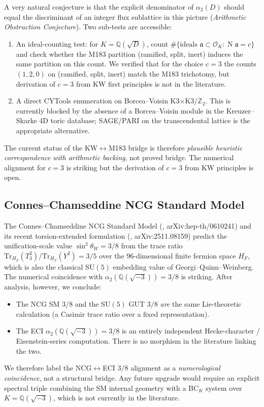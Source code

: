 \documentclass[12pt]{amsart}
\theoremstyle{definition}
\DeclareMathOperator{\Nm}{N}
\newcommand{\Q}{\mathbb{Q}}
\newcommand{\Z}{\mathbb{Z}}
\newcommand{\OK}{\mathcal{O}_K}
\begin{document}
A very natural conjecture is that the explicit denominator of
$\alpha_2(D)$ should equal the discriminant of an integer flux
sublattice in this picture (\emph{Arithmetic Obstruction
Conjecture}). Two sub-tests are accessible:
\begin{enumerate}[leftmargin=2em]
  \item An ideal-counting test: for $K = \Q(\sqrt{D})$, count
        $\#\{\text{ideals } \mathfrak{a} \subset \OK : \Nm \mathfrak{a} = c\}$
        and check whether the M183 partition (ramified, split, inert)
        induces the same partition on this count. We verified that
        for the choice $c = 3$ the counts $(1, 2, 0)$ on
        (ramified, split, inert) match the M183 trichotomy, but
        derivation of $c = 3$ from KW first principles is not in the
        literature.
  \item A direct CYTools enumeration on Borcea--Voisin K3$\times$K3$/\Z_2$.
        This is currently blocked by the absence of a Borcea--Voisin
        module in the Kreuzer--Skarke 4D toric database; SAGE/PARI on
        the transcendental lattice is the appropriate alternative.
\end{enumerate}
The current status of the KW$\leftrightarrow$M183 bridge is therefore
\emph{plausible heuristic correspondence with arithmetic backing}, not
proved bridge. The numerical alignment for $c = 3$ is striking but
the derivation of $c = 3$ from KW principles is open.

\subsection{Connes--Chamseddine NCG Standard Model}

The Connes--Chamseddine NCG Standard Model
(\cite{ChamseddineConnesMarcolli2007}, arXiv:hep-th/0610241) and its
recent torsion-extended formulation
(\cite{DabrowskiMukhopadhyayPozar2025}, arXiv:2511.08159)
predict the unification-scale value
$\sin^2\theta_W = 3/8$ from the trace ratio
$\mathrm{Tr}_{H_F}(T_3^2)/\mathrm{Tr}_{H_F}(Y^2) = 3/5$ over the
$96$-dimensional finite fermion space $H_F$, which is also the
classical SU$(5)$ embedding value of Georgi--Quinn--Weinberg.
The numerical coincidence with $\alpha_2(\Q(\sqrt{-3})) = 3/8$ is
striking. After analysis, however, we conclude:
\begin{itemize}[leftmargin=2em]
  \item The NCG SM $3/8$ and the SU$(5)$ GUT $3/8$ \emph{are} the same
        Lie-theoretic calculation (a Casimir trace ratio over a fixed
        representation).
  \item The ECI $\alpha_2(\Q(\sqrt{-3})) = 3/8$ is an entirely independent
        Hecke-character / Eisenstein-series computation. There is no
        morphism in the literature linking the two.
\end{itemize}
We therefore label the NCG$\leftrightarrow$ECI $3/8$ alignment as a
\emph{numerological coincidence}, not a structural bridge. Any future
upgrade would require an explicit spectral triple combining the SM
internal geometry with a BC$_K$ system over $K = \Q(\sqrt{-3})$,
which is not currently in the literature.
\end{document}
